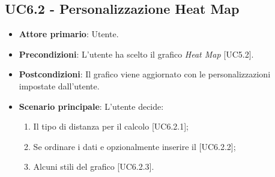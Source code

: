 \subsection{UC6.2 - Personalizzazione Heat Map}
\begin{itemize}
	\item \textbf{Attore primario}: Utente.
	
	\item \textbf{Precondizioni}: L'utente ha scelto il grafico \textit{Heat Map} [UC5.2].
	
	\item \textbf{Postcondizioni}: Il grafico viene aggiornato con le personalizzazioni impostate dall'utente.
	
	\item \textbf{Scenario principale}: L'utente decide:
	
\begin{enumerate}
\item Il tipo di distanza per il calcolo [UC6.2.1];
\item Se ordinare i dati e opzionalmente inserire il  [UC6.2.2];
\item Alcuni stili del grafico [UC6.2.3].
\end{enumerate}	
		
\end{itemize}
